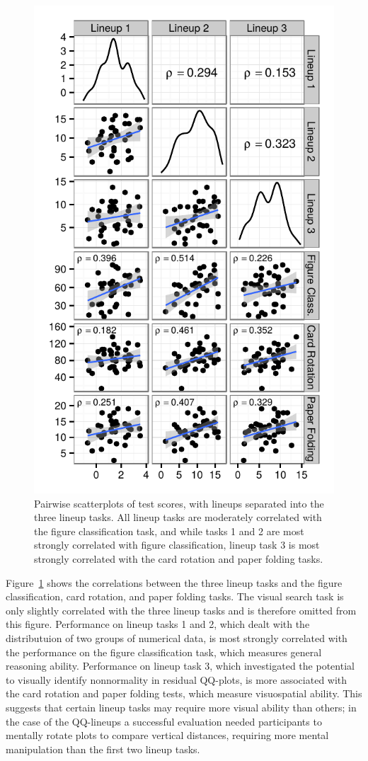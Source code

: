 \documentclass[11pt]{isuthesis}\usepackage[]{graphicx}\usepackage[]{color}
\begin{document}
\begin{figure}[ht]\centering
\includegraphics[width=.5\linewidth]{fig-LineupTypeSPM-1}
\caption[Pairwise scatterplots of test scores and lineups separated by task]{Pairwise scatterplots of test scores, with lineups separated into the three lineup tasks. All lineup tasks are moderately correlated with the figure classification task, and while tasks 1 and 2 are most strongly correlated with figure classification, lineup task 3 is most strongly correlated with the card rotation and paper folding tasks. \label{fig:lineuptaskmatrix}}
\end{figure}
Figure~\ref{fig:lineuptaskmatrix} shows the correlations between the three lineup tasks and the figure classification, card rotation, and paper folding tasks. The visual search task is only slightly correlated with the three lineup tasks and is therefore omitted from this figure. Performance on lineup tasks 1 and 2, which dealt with the distributuion of two groups of numerical data, is most strongly correlated with the performance on the figure classification task, which measures general reasoning ability.
Performance on lineup task 3, which investigated the potential to visually identify nonnormality in residual QQ-plots, is more associated with the card rotation and paper folding tests, which measure visuospatial ability. This suggests that certain lineup tasks may require more visual ability than others; in the case of the QQ-lineups a successful evaluation  needed  participants to mentally rotate plots to compare vertical distances, requiring more mental manipulation than the first two lineup tasks.
\end{document}

